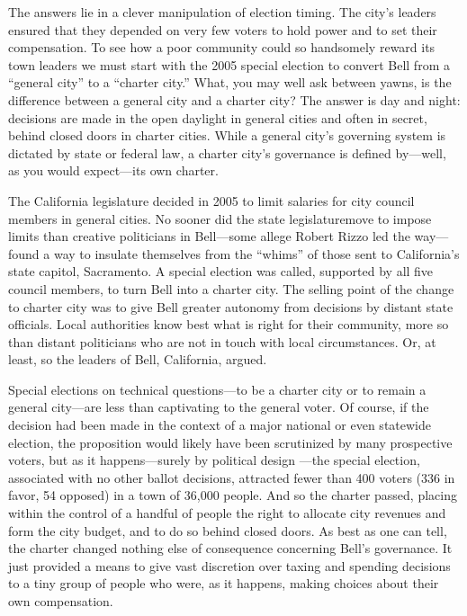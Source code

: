 \documentclass[10pt]{article}
\begin{document}
{\large The answers lie in a clever manipulation of election timing. The city's
leaders ensured that they depended on very few voters to hold power and to set
their compensation. To see how a poor community could so handsomely reward its
town leaders we must start with the 2005 special election to convert Bell from a
``general city'' to a ``charter city.'' What, you may well ask between yawns, is
the difference between a general city and a charter city? The answer is day and
night: decisions are made in the open daylight in general cities and often in
secret, behind closed doors in charter cities. While a general city's governing
system is dictated by state or federal law, a charter city's governance is
defined by---well, as you would expect---its own charter.}

{\large The California legislature decided in 2005 to limit salaries for city
council members in general cities. No sooner did the state legislaturemove to
impose limits than creative politicians in Bell---some allege Robert Rizzo led
the way---found a way to insulate themselves from the ``whims'' of those sent to
California's state capitol, Sacramento. A special election was called, supported
by all five council members, to turn Bell into a charter city. The selling point
of the change to charter city was to give Bell greater autonomy from decisions by
distant state officials. Local authorities know best what is right for their
community, more so than distant politicians who are not in touch with local
circumstances. Or, at least, so the leaders of Bell, California, argued.}

{\large Special elections on technical questions---to be a charter city or to
remain a general city---are less than captivating to the general voter. Of
course, if the decision had been made in the context of a major national or even
statewide election, the proposition would likely have been scrutinized by many
prospective voters, but as it happens---surely by political design ---the special
election, associated with no other ballot decisions, attracted fewer than 400
voters (336 in favor, 54 opposed) in a town of 36,000 people. And so the charter
passed, placing within the control of a handful of people the right to allocate
city revenues and form the city budget, and to do so behind closed doors. As best
as one can tell, the charter changed nothing else of consequence concerning
Bell's governance. It just provided a means to give vast discretion over taxing
and spending decisions to a tiny group of people who were, as it happens, making
choices about their own compensation.}
\end{document}
